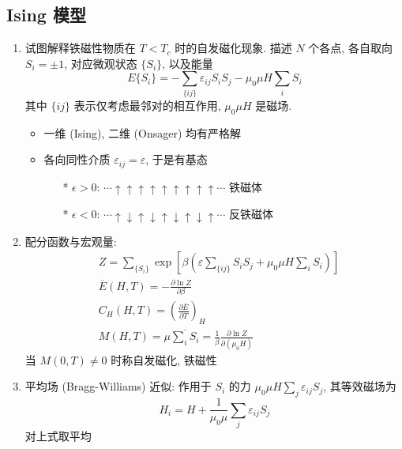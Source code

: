 \documentclass[12pt,a4paper]{article}%
\numberwithin{equation}{section}
\begin{document}
\subsection{Ising 模型} %
\label{sub:ising_model}
\begin{enumerate}
    \item 试图解释铁磁性物质在 $T<T_c$ 时的自发磁化现象. 描述 $N$ 个各点, 各自取向 $S_i = \pm 1$, 对应微观状态 $\{S_i\}$, 以及能量
    \begin{equation}
        E\{S_i\} = -\sum_{\{ij\}}\varepsilon_{ij}S_iS_j - \mu_0\mu H\sum_i S_i
    \end{equation}
    其中 $\{ij\}$ 表示仅考虑最邻对的相互作用, $\mu_0\mu H$ 是磁场.
    \begin{itemize}
        \item 一维 (Ising), 二维 (Onsager) 均有严格解
        \item 各向同性介质 $\varepsilon_{ij} = \varepsilon$, 于是有基态
        \begin{itemize}
            \item[*] $\epsilon > 0$: $\cdots\uparrow\uparrow\uparrow\uparrow\uparrow\uparrow\uparrow\uparrow\uparrow\cdots $ 铁磁体
            \item[*] $\epsilon < 0$: $\cdots\uparrow\downarrow\uparrow\downarrow\uparrow\downarrow\uparrow\downarrow\uparrow\cdots $ 反铁磁体
        \end{itemize}
    \end{itemize}
    \item 配分函数与宏观量:
    \begin{align}
        &Z = \sum_{\{S_i\}}\exp\left[\beta\left(\varepsilon\sum_{\{ij\}} S_iS_j+ \mu_0\mu H\sum_i S_i\right)\right] \\
        &\overline E (H,T) = -\frac{\partial \ln Z}{\partial\beta} \\
        &C_H (H,T) = \left(\frac{\partial \overline E}{\partial T}\right)_H \\
        &M(H,T) = \mu\overline{\sum_i S_i} = \frac 1\beta \frac{\partial\ln Z}{\partial(\mu_0 H)}
    \end{align}
    当 $M(0,T)\neq 0$ 时称自发磁化, 铁磁性
    \item 平均场 (Bragg-Williams) 近似: 作用于 $S_i$ 的力 $\mu_0\mu H\sum_j\varepsilon_{ij}S_j$, 其等效磁场为
    \begin{equation}
        H_i = H + \frac 1{\mu_0\mu}\sum_j\varepsilon_{ij} S_j
    \end{equation}
    对上式取平均
    \begin{equation}

\end{equation}
\end{enumerate}
\end{document}
